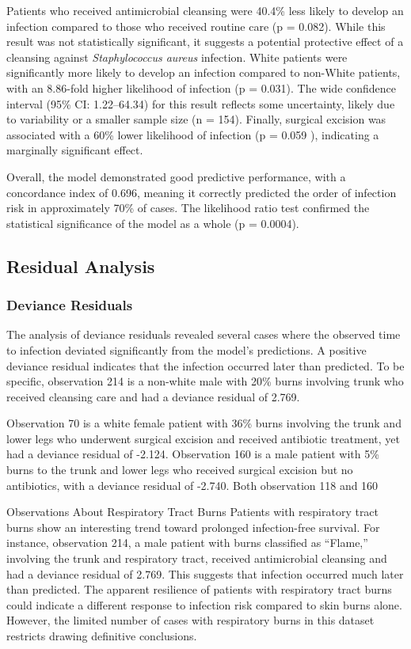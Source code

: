 \documentclass[12pt]{article}
\begin{document}
Patients who received antimicrobial cleansing were 40.4\% less likely to
develop an infection compared to those who received routine care (p =
0.082). While this result was not statistically significant, it suggests
a potential protective effect of a cleansing against
\emph{Staphylococcus aureus} infection. White patients were
significantly more likely to develop an infection compared to non-White
patients, with an 8.86-fold higher likelihood of infection (p = 0.031).
The wide confidence interval (95\% CI: 1.22--64.34) for this result
reflects some uncertainty, likely due to variability or a smaller sample
size (n = 154). Finally, surgical excision was associated with a 60\%
lower likelihood of infection (p = 0.059 ), indicating a marginally
significant effect.

Overall, the model demonstrated good predictive performance, with a
concordance index of 0.696, meaning it correctly predicted the order of
infection risk in approximately 70\% of cases. The likelihood ratio test
confirmed the statistical significance of the model as a whole (p =
0.0004).

\subsection{Residual Analysis}\label{residual-analysis}

\subsubsection{Deviance Residuals}\label{deviance-residuals}

The analysis of deviance residuals revealed several cases where the
observed time to infection deviated significantly from the model's
predictions. A positive deviance residual indicates that the infection
occurred later than predicted. To be specific, observation 214 is a
non-white male with 20\% burns involving trunk who received cleansing
care and had a deviance residual of 2.769.

Observation 70 is a white female patient with 36\% burns involving the
trunk and lower legs who underwent surgical excision and received
antibiotic treatment, yet had a deviance residual of -2.124. Observation
160 is a male patient with 5\% burns to the trunk and lower legs who
received surgical excision but no antibiotics, with a deviance residual
of -2.740. Both observation 118 and 160

Observations About Respiratory Tract Burns Patients with respiratory
tract burns show an interesting trend toward prolonged infection-free
survival. For instance, observation 214, a male patient with burns
classified as ``Flame,'' involving the trunk and respiratory tract,
received antimicrobial cleansing and had a deviance residual of 2.769.
This suggests that infection occurred much later than predicted. The
apparent resilience of patients with respiratory tract burns could
indicate a different response to infection risk compared to skin burns
alone. However, the limited number of cases with respiratory burns in
this dataset restricts drawing definitive conclusions.
\end{document}
